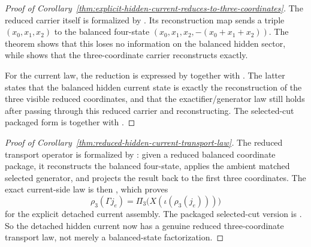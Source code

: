 \begin{proof}[Proof of Corollary~\ref{thm:explicit-hidden-current-reduces-to-three-coordinates}]
\label{proof:thm:explicit-hidden-current-reduces-to-three-coordinates}
The reduced carrier itself is formalized by
. Its reconstruction map
 sends a triple
\((x_0,x_1,x_2)\) to the balanced four-state
\((x_0,x_1,x_2,-(x_0+x_1+x_2))\). The theorem
shows that this loses no information on the balanced hidden sector, while
 shows
that the three-coordinate carrier reconstructs exactly.

For the current law, the reduction is expressed by
 together with
. The latter states
that the balanced hidden current state is exactly the reconstruction of the
three visible reduced coordinates, and that the exactifier/generator law still
holds after passing through this reduced carrier and reconstructing. The
selected-cut packaged form is
together with
.
\end{proof}

\begin{proof}[Proof of Corollary~\ref{thm:reduced-hidden-current-transport-law}]
\label{proof:thm:reduced-hidden-current-transport-law}
The reduced transport operator is formalized by
: given a reduced balanced
coordinate package, it reconstructs the balanced four-state, applies the ambient
matched selected generator, and projects the result back to the first three
coordinates. The exact current-side law is then
, which proves
\[
\rho_3(\Gamma j_e)=\Pi_3\!\bigl(X(\iota(\rho_3(j_e)))\bigr)
\]
for the explicit detached current assembly. The packaged selected-cut version is
.
So the detached hidden current now has a genuine reduced three-coordinate
transport law, not merely a balanced-state factorization.
\end{proof}

